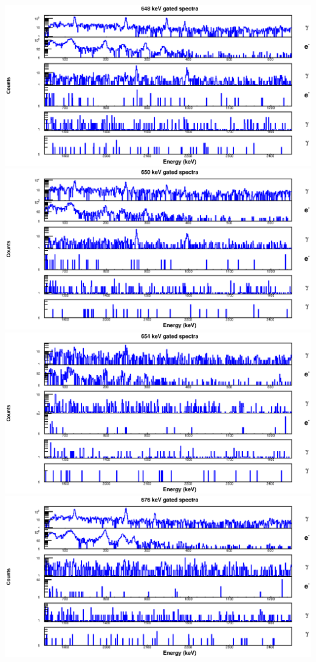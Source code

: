 \begin{landscape}
\includegraphics[scale=1.2]{154Gd_Appendix/648_combined.eps}
\includegraphics[scale=1.2]{154Gd_Appendix/650_combined.eps}
\includegraphics[scale=1.2]{154Gd_Appendix/654_combined.eps}
\includegraphics[scale=1.2]{154Gd_Appendix/676_combined.eps}

\end{landscape}
